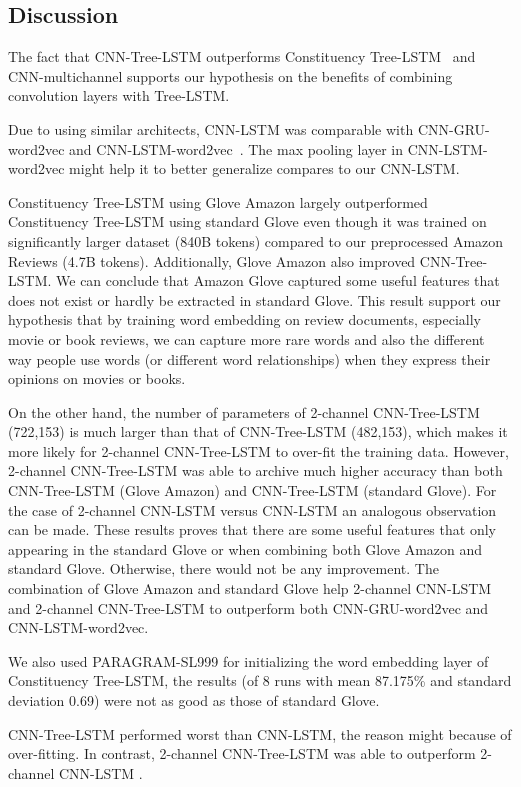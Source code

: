 \subsection{Discussion}
The fact that CNN-Tree-LSTM outperforms Constituency Tree-LSTM~\cite{treeLSTM} and CNN-multichannel\cite{KimCNN} supports our hypothesis on the benefits of combining convolution layers with Tree-LSTM.

Due to using similar architects, CNN-LSTM was comparable with CNN-GRU-word2vec and CNN-LSTM-word2vec~\cite{cnn-rnn}.
The max pooling layer in CNN-LSTM-word2vec might help it to better generalize compares to our CNN-LSTM.

Constituency Tree-LSTM using Glove Amazon largely outperformed Constituency Tree-LSTM using standard Glove even though it was trained on significantly larger dataset (840B tokens) compared to our preprocessed Amazon Reviews (4.7B tokens).
Additionally, Glove Amazon also improved CNN-Tree-LSTM.
We can conclude that Amazon Glove captured some useful features that does not exist or hardly be extracted in standard Glove.
This result support our hypothesis that by training word embedding on review documents, especially movie or book reviews, we can capture more rare words and also the different way people use words (or different word relationships) when they express their opinions on movies or books.

On the other hand, the number of parameters of 2-channel CNN-Tree-LSTM (722,153) is much larger than that of CNN-Tree-LSTM (482,153), which makes it more likely for 2-channel CNN-Tree-LSTM to over-fit the training data.
However, 2-channel CNN-Tree-LSTM was able to archive much higher accuracy than both CNN-Tree-LSTM (Glove Amazon) and CNN-Tree-LSTM (standard Glove).
For the case of 2-channel CNN-LSTM versus CNN-LSTM an analogous observation can be made.
These results proves that there are some useful features that only appearing in the standard Glove or when combining both Glove Amazon and standard Glove.
Otherwise, there would not be any improvement.
The combination of Glove Amazon and standard Glove help 2-channel CNN-LSTM and 2-channel CNN-Tree-LSTM to outperform both CNN-GRU-word2vec and CNN-LSTM-word2vec.

We also used PARAGRAM-SL999 for initializing the word embedding layer of Constituency Tree-LSTM,
the results (of 8 runs with mean 87.175\% and standard deviation 0.69) were not as good as those of standard Glove.

CNN-Tree-LSTM performed worst than CNN-LSTM, the reason might because of over-fitting.
In contrast, 2-channel CNN-Tree-LSTM was able to outperform 2-channel CNN-LSTM .
